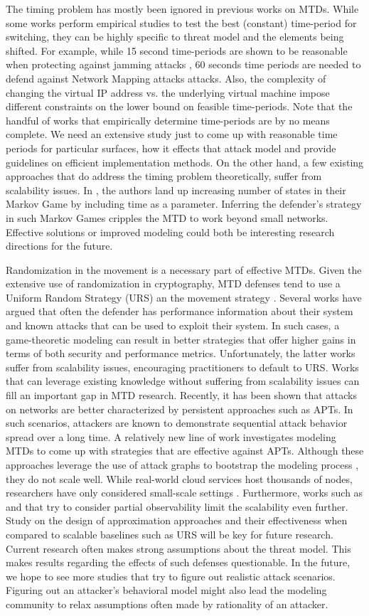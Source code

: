 {
The timing problem has mostly been ignored in previous works on MTDs. While some works perform empirical studies to test the best (constant) time-period for switching, they can be highly specific to threat model and the elements being shifted. For example, while 15 second time-periods are shown to be reasonable when protecting against jamming attacks , 60 seconds time periods are needed to defend against Network Mapping attacks  attacks. Also, the complexity of changing the virtual IP address vs. the underlying virtual machine impose different constraints on the lower bound on feasible time-periods.
}
{
Note that the handful of works that empirically determine time-periods are by no means complete. We need an extensive study just to come up with reasonable time periods for particular surfaces, how it effects that attack model and provide guidelines on efficient implementation methods.
}
On the other hand, a few existing approaches that do address the timing problem theoretically, suffer from scalability issues. In , the authors land up increasing number of states in their Markov Game by including time as a parameter. Inferring the defender's strategy in such Markov Games cripples the MTD to work beyond small networks. Effective solutions or improved modeling could both be interesting research directions for the future.

Randomization in the movement is a necessary part of effective MTDs. Given the extensive use of randomization in cryptography, MTD defenses tend to use a Uniform Random Strategy (URS) an the movement strategy . Several works have argued that often the defender has performance information about their system and known attacks that can be used to exploit their system. In such cases, a game-theoretic modeling can result in better strategies that offer higher gains in terms of both security and performance metrics. Unfortunately, the latter works suffer from scalability issues, encouraging practitioners to default to URS. Works that can leverage existing knowledge without suffering from scalability issues can fill an important gap in MTD research.
Recently, it has been shown that attacks on networks are better characterized by persistent approaches such as APTs. In such scenarios, attackers are known to demonstrate sequential attack behavior spread over a long time.
A relatively new line of work investigates modeling MTDs to come up with strategies that are effective against APTs. Although these approaches leverage the use of attack graphs to bootstrap the modeling process , they do not scale well. While real-world cloud services host thousands of nodes, researchers have only considered small-scale settings . Furthermore, works such as  and  that try to consider partial observability limit the scalability even further. Study on the design of approximation approaches and their effectiveness when compared to scalable baselines such as URS will be key for future research.
Current research often makes strong assumptions about the threat model. This makes results regarding the effects of such defenses questionable. In the future, we hope to see more studies that try to figure out realistic attack scenarios. Figuring out an attacker's behavioral model might also lead the modeling community to relax assumptions often made by rationality of an attacker.

